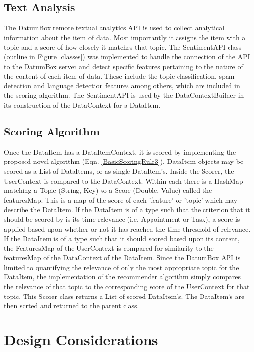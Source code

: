 \subsection{Text Analysis}

The DatumBox \cite{DatumBox} remote textual analytics API is used to collect analytical information about the item of data. Most importantly it assigns the item with a topic and a score of how closely it matches that topic. The SentimentAPI class (outline in Figure \ref{classes}) was implemented to handle the connection of the API to the DatumBox server and detect specific features pertaining to the nature of the content of each item of data. These include the topic classification, spam detection and language detection features among others, which are included in the scoring algorithm. 
The SentimentAPI is used by the DataContextBuilder in its construction of the DataContext for a DataItem. 

\subsection{Scoring Algorithm}

Once the DataItem has a DataItemContext, it is scored by implementing the proposed novel algorithm (Eqn. \ref{BasicScoringRule3}). DataItem objects may be scored as a List of DataItems, or as single DataItem's. 
Inside the Scorer, the UserContext is compared to the DataContext. Within each there is a HashMap matching a Topic (String, Key) to a Score (Double, Value) called the featuresMap. This is a map of the score of each 'feature' or 'topic' which may describe the DataItem.
If the DataItem is of a type such that the criterion that it should be scored by is its time-relevance (i.e. Appointment or Task), a score is applied based upon whether or not it has reached the time threshold of relevance. If the DataItem is of a type such that it should scored based upon its content, the FeaturesMap of the UserContext is compared for similarity to the featuresMap of the DataContext of the DataItem.
Since the DatumBox API is limited to quantifying the relevance of only the most appropriate topic for the DataItem, the implementation of the recommender algorithm simply compares the relevance of that topic to the corresponding score of the UserContext for that topic. 
This Scorer class returns a List of scored DataItem's. The DataItem's are then sorted and returned to the parent class.

\section{Design Considerations}

